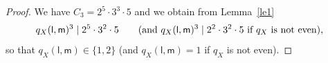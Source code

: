 \documentclass[12pt]{amsart}
\def\Z{{\bf Z}}
\theoremstyle{remark}
\def\lll{\ensuremath{\mathsf l}}
\def\mm{\ensuremath{\mathsf m}}
\begin{document}
\begin{proof}
%
%
%
%
%
 We have $C_3=2^5\cdot 3^3\cdot 5$ and we obtain   from Lemma~\ref{le1}
\begin{equation*} 
q_X(\lll,\mm)^3\mid    2^5\cdot 3^2\cdot 5 \qquad\textnormal{(and $ q_X(\lll,\mm)^3 \mid 2^2 \cdot 3^2\cdot 5 $ if $q_X$ is not even),}
\end{equation*}
so that $ q_X(\lll,\mm)\in\{1,2\}$ (and $ q_X(\lll,\mm)=1 $ if $q_X$ is not even).

\medskip


\end{proof}
\end{document}
